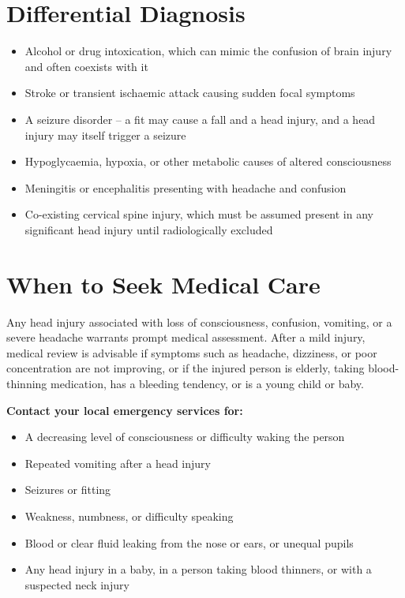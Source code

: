 \section*{Differential Diagnosis}
\begin{itemize}
    \item Alcohol or drug intoxication, which can mimic the confusion of brain injury and often coexists with it
    \item Stroke or transient ischaemic attack causing sudden focal symptoms
    \item A seizure disorder -- a fit may cause a fall and a head injury, and a head injury may itself trigger a seizure
    \item Hypoglycaemia, hypoxia, or other metabolic causes of altered consciousness
    \item Meningitis or encephalitis presenting with headache and confusion
    \item Co-existing cervical spine injury, which must be assumed present in any significant head injury until radiologically excluded
\end{itemize}

\section*{When to Seek Medical Care}
Any head injury associated with loss of consciousness, confusion, vomiting, or a severe headache warrants prompt medical assessment. After a mild injury, medical review is advisable if symptoms such as headache, dizziness, or poor concentration are not improving, or if the injured person is elderly, taking blood-thinning medication, has a bleeding tendency, or is a young child or baby.

\textbf{Contact your local emergency services for:}
\begin{itemize}
    \item A decreasing level of consciousness or difficulty waking the person
    \item Repeated vomiting after a head injury
    \item Seizures or fitting
    \item Weakness, numbness, or difficulty speaking
    \item Blood or clear fluid leaking from the nose or ears, or unequal pupils
    \item Any head injury in a baby, in a person taking blood thinners, or with a suspected neck injury
\end{itemize}

